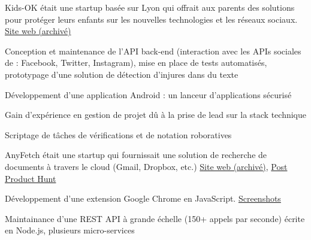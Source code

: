 \documentclass[
  french,
  a4paper
]{resume-openfont}
\begin{document}
\begin{minipage}[t]{0.66\textwidth}
%
%
Kids-OK était une startup basée sur Lyon qui offrait aux parents des solutions pour protéger leurs enfants sur les nouvelles technologies et les réseaux sociaux. \href{https://i.imgur.com/ZAXWuZN.png}{Site web (archivé)}
\vspace{\topsep}
\begin{tightemize}
\item Conception et maintenance de l'API back-end (interaction avec les APIs sociales de : Facebook, Twitter, Instagram), mise en place de tests automatisés, prototypage d'une solution de détection d'injures dans du texte
\item Développement d'une application Android : un lanceur d'applications sécurisé
\item Gain d'expérience en gestion de projet dû à la prise de lead sur la stack technique
\end{tightemize}
\sectionsep

%
%
\vspace{\topsep}
\begin{tightemize}
\item Scriptage de tâches de vérifications et de notation roboratives
\end{tightemize}
\sectionsep

%
%
AnyFetch était une startup qui fournissait une solution de recherche de documents à travers le cloud (Gmail, Dropbox, etc.) \href{https://i.imgur.com/B3MMD6Y.png}{Site web (archivé)}, \href{https://www.producthunt.com/posts/anyfetch}{Post Product Hunt}
\vspace{\topsep}
\begin{tightemize}
\item Développement d'une extension Google Chrome en JavaScript. \href{https://i.imgur.com/yql5v1z.png}{Screenshots}
\item Maintainance d'une REST API à grande échelle (150+ appels par seconde) écrite en Node.js, plusieurs micro-services
\end{tightemize}



\end{minipage}
\end{document}
